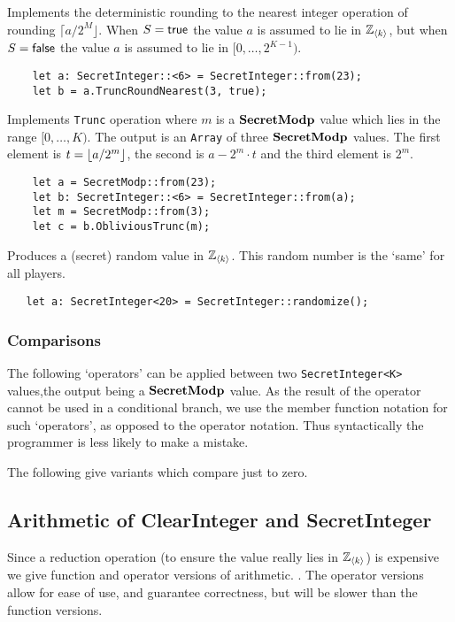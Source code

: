 Implements the deterministic rounding to the nearest integer operation
of rounding $\lceil a/2^M \rfloor$.
When $S={\mathsf{true}}$ the value $a$ is assumed to lie in ${\mathbb{Z}}_{\langle k \rangle}$,
but when $S={\mathsf{false}}$ the value $a$ is assumed to lie in $[0,\ldots,2^{K-1})$.
\begin{lstlisting}
    let a: SecretInteger::<6> = SecretInteger::from(23);
    let b = a.TruncRoundNearest(3, true);
\end{lstlisting}

Implements \verb|Trunc| operation where $m$ is a $\mathbf{SecretModp}$ value
which lies in the range $[0,\ldots,K)$. The output is an \verb|Array| of three
$\mathbf{SecretModp}$ values.
The first element is $t = {\lfloor a/2^m \rfloor}$, the second is $a-2^m \cdot t$
and the third element is $2^m$.
\begin{lstlisting}
    let a = SecretModp::from(23);
    let b: SecretInteger::<6> = SecretInteger::from(a);
    let m = SecretModp::from(3);
    let c = b.ObliviousTrunc(m);
\end{lstlisting}


Produces a (secret) random value in ${\mathbb{Z}}_{\langle k \rangle}$.
This random number is the `same' for all players.
\begin{lstlisting}
   let a: SecretInteger<20> = SecretInteger::randomize();
\end{lstlisting}

\subsubsection{Comparisons}
The following `operators' can be applied between two \verb|SecretInteger<K>| 
values,the output being a $\mathbf{SecretModp}$ value.
As the result of the operator cannot be used in a conditional branch,
we use the member function notation for such `operators', as opposed
to the operator notation. Thus syntactically the programmer is less
likely to make a mistake.

\noindent
The following give variants which compare just to zero.

\subsection{Arithmetic of ClearInteger and SecretInteger}
Since a reduction operation (to ensure the value really lies in
${\mathbb{Z}}_{\langle k \rangle}$) is expensive we give function and operator versions of arithmetic.
.
The operator versions allow for ease of use, and guarantee correctness,
but will be slower than the function versions.

